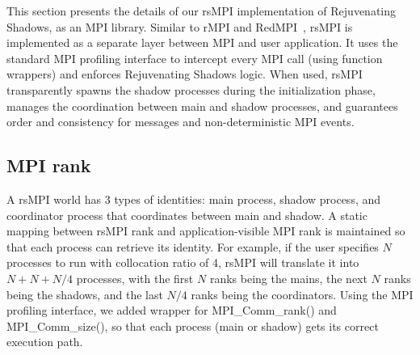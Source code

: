 This section presents the details of our rsMPI implementation of Rejuvenating Shadows, as an MPI library. 
Similar to rMPI and RedMPI~\cite{ferreira_sc_2011,fiala_2012_sdc}, rsMPI is implemented as a separate layer between MPI and user application. It uses the standard MPI profiling interface to intercept every MPI call (using function wrappers) and enforces Rejuvenating Shadows logic. 
When used, rsMPI transparently spawns the shadow processes during the initialization phase, manages the coordination between main and shadow processes, and guarantees order and consistency for messages and non-deterministic MPI events.

\subsection{MPI rank}
A rsMPI world has 3 types of identities: main process, shadow process, and coordinator process that coordinates between main and shadow. A static mapping between rsMPI rank and application-visible MPI rank is maintained so that each process can retrieve its identity. For example, if the user specifies $N$ processes to run with collocation ratio of 4, rsMPI will translate it into $N + N + N/4$ processes, %
with the first $N$ ranks being the mains, the next $N$ ranks being the shadows, and the last $N/4$ ranks being the coordinators. 
Using the MPI profiling interface, we added wrapper for MPI\_Comm\_rank() and MPI\_Comm\_size(), so that each process (main or shadow) gets its correct execution path.


